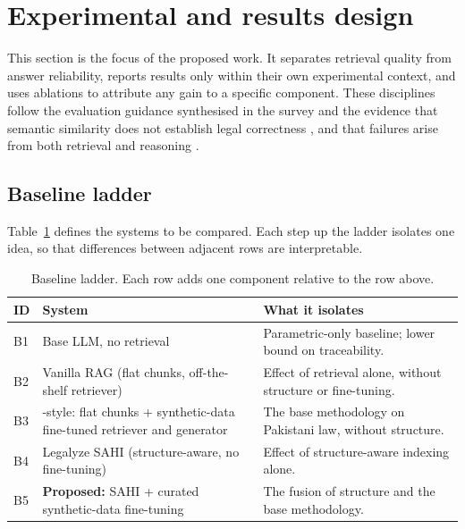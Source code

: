 \documentclass[10pt,twocolumn]{article}
\renewcommand{\arraystretch}{1.25}
\begin{document}
\section{Experimental and results design}
\label{sec:rd-results}

This section is the focus of the proposed work. It separates retrieval quality from answer reliability,
reports results only within their own experimental context, and uses ablations to attribute any gain to
a specific component. These disciplines follow the evaluation guidance synthesised in the survey and the
evidence that semantic similarity does not establish legal correctness \citep{silva2026}, and that
failures arise from both retrieval and reasoning \citep{afane2026}.

\subsection{Baseline ladder}
\label{sec:rd-baselines}

Table~\ref{tab:rd-baselines} defines the systems to be compared. Each step up the ladder isolates one
idea, so that differences between adjacent rows are interpretable.

\begin{table}[t]
\centering
\caption{Baseline ladder. Each row adds one component relative to the row above.}
\label{tab:rd-baselines}
\footnotesize
\setlength{\tabcolsep}{5pt}
\renewcommand{\arraystretch}{1.3}
\begin{tabularx}{\textwidth}{>{\raggedright\arraybackslash}p{1.1cm} >{\raggedright\arraybackslash}p{5.0cm} >{\raggedright\arraybackslash}X}
\toprule
\textbf{ID} & \textbf{System} & \textbf{What it isolates} \\
\midrule
B1 & Base LLM, no retrieval & Parametric-only baseline; lower bound on traceability. \\
B2 & Vanilla RAG (flat chunks, off-the-shelf retriever) & Effect of retrieval alone, without structure or fine-tuning. \\
B3 & \citet{ren2026}-style: flat chunks + synthetic-data fine-tuned retriever and generator & The base methodology on Pakistani law, without structure. \\
B4 & Legalyze SAHI (structure-aware, no fine-tuning) \citep{hamza2026} & Effect of structure-aware indexing alone. \\
B5 & \textbf{Proposed:} SAHI + curated synthetic-data fine-tuning & The fusion of structure and the base methodology. \\
\bottomrule
\end{tabularx}
\end{table}
\end{document}
